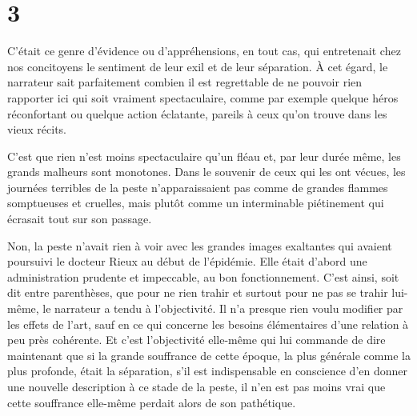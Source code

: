 \documentclass[french,twoside]{book} %
\begin{document}
\section[{3}]{3}
\noindent C’était ce genre d’évidence ou d’appréhensions, en tout cas, qui entretenait chez nos concitoyens le sentiment de leur exil et de leur séparation. À cet égard, le narrateur sait parfaitement combien il est regrettable de ne pouvoir rien rapporter ici qui soit vraiment spectaculaire, comme par exemple quelque héros réconfortant ou quelque action éclatante, pareils à ceux qu’on trouve dans les vieux récits.\par
C’est que rien n’est moins spectaculaire qu’un fléau et, par leur durée même, les grands malheurs sont monotones. Dans le souvenir de ceux qui les ont vécues, les journées terribles de la peste n’apparaissaient pas comme de grandes flammes somptueuses et cruelles, mais plutôt comme un interminable piétinement qui écrasait tout sur son passage.\par
Non, la peste n’avait rien à voir avec les grandes images exaltantes qui avaient poursuivi le docteur Rieux au début de l’épidémie. Elle était d’abord une administration prudente et impeccable, au bon fonctionnement. C’est ainsi, soit dit entre parenthèses, que pour ne rien trahir et surtout pour ne pas se trahir lui-même, le narrateur a tendu à l’objectivité. Il n’a presque rien voulu modifier par les effets de l’art, sauf en ce qui concerne les besoins élémentaires d’une relation à peu près cohérente. Et c’est l’objectivité elle-même qui lui commande de dire maintenant que si la grande souffrance de cette époque, la plus générale comme la plus profonde, était la séparation, s’il est indispensable en conscience d’en donner une nouvelle description à ce stade de la peste, il n’en est pas moins vrai que cette souffrance elle-même perdait alors de son pathétique.\par
\end{document}
